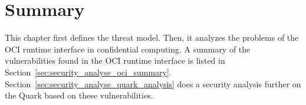 \section{Summary}
\label{sec:security_summarize}

This chapter first defines the threat model. Then, it analyzes the problems of the OCI runtime interface in confidential computing. A summary of the vulnerabilities found in the OCI runtime interface is listed in Section~\ref{sec:security_analyse_oci_summary}. Section~\ref{sec:security_analyse_quark_analysis} does a security analysis further on the Quark 
based on these vulnerabilities.
 
\cleardoublepage

